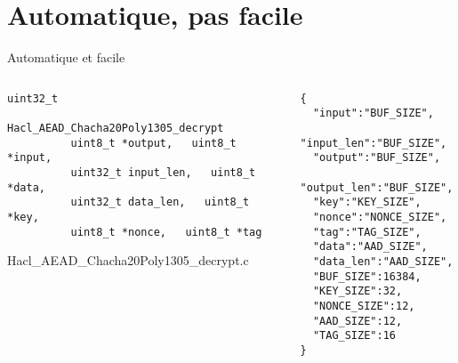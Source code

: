 \documentclass[A4,svgnames,9pt,aspectratio=169]{beamer}
\begin{document}

\section{Automatique, pas facile}
\frame{\sectionpage}

\begin{frame}[fragile]{Automatique et facile}


  \begin{columns}
    \begin{column}{0.5\textwidth}
      \begin{lstlisting}[style=global, caption={Hacl\_AEAD\_Chacha20Poly1305\_decrypt}, gobble=8]
        uint32_t
          Hacl_AEAD_Chacha20Poly1305_decrypt
          uint8_t *output,   uint8_t *input,
          uint32_t input_len,   uint8_t *data,
          uint32_t data_len,   uint8_t *key,
          uint8_t *nonce,   uint8_t *tag
      \end{lstlisting}
      \vspace{2cm}
      Hacl\_AEAD\_Chacha20Poly1305\_decrypt.c
    \end{column}


    \begin{column}{0.5\textwidth}

      \begin{lstlisting}[style=CStyle, caption={matching.json}]
{
  "input":"BUF_SIZE",
  "input_len":"BUF_SIZE",
  "output":"BUF_SIZE",
  "output_len":"BUF_SIZE",
  "key":"KEY_SIZE",
  "nonce":"NONCE_SIZE",
  "tag":"TAG_SIZE",
  "data":"AAD_SIZE",
  "data_len":"AAD_SIZE",
  "BUF_SIZE":16384,
  "KEY_SIZE":32,
  "NONCE_SIZE":12,
  "AAD_SIZE":12,
  "TAG_SIZE":16
}
      \end{lstlisting}

    \end{column}
  \end{columns}

\end{frame}
\end{document}
